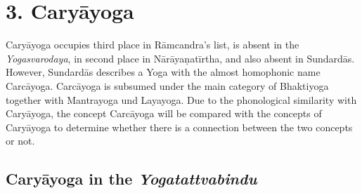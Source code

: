 

\section{3. Caryāyoga}
\label{caryayogaintro}

Caryāyoga occupies third place in Rāmcandra's list, is absent in the \textit{Yogasvarodaya}, in second place in Nārāyaṇatīrtha, and also absent in Sundardās. However, Sundardās describes a Yoga with the almost homophonic name Carcāyoga. Carcāyoga is subsumed under the main category of Bhaktiyoga together with Mantrayoga und Layayoga. Due to the phonological similarity with Caryāyoga, the concept Carcāyoga will be compared with the concepts of Caryāyoga to determine whether there is a connection between the two concepts or not. 

\subsection{Caryāyoga in the \textit{Yogatattvabindu}}

